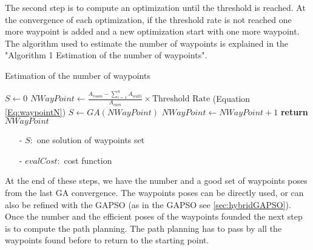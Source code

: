 The second step is to compute an optimization until the threshold is reached. At the convergence of each optimization, if the threshold rate is not reached one more waypoint is added and a new optimization start with one more waypoint. The algorithm used to estimate the number of waypoints is explained in the "Algorithm 1 Estimation of the number of waypoints".  \\
\begin{algorithm}{}
\caption{Estimation of the number of waypoints}\label{alg:euclid}
\begin{algorithmic}[6]
 \State $S\gets 0$
  \State $NWayPoint\gets \frac{ A_{room} - \sum_{i=1}^n A_{wall i} }{A_{cam}} \times \mbox{Threshold Rate} 
 $  (Equation \ref{Eq:waypointN})
	 \State $S \gets GA(NWayPoint)$
	  \State $NWayPoint\gets NWayPoint+1$
  \EndWhile\label{endwhile}
\State \textbf{return} $NWayPoint$
\EndProcedure
\end{algorithmic}
\end{algorithm}
\begin{itemize}
\item[-] $S:$ one solution of waypoints set 
\item[-] $evalCost:$ cost function  
\end{itemize}
At the end of these steps, we have the number and a good set of waypoints poses from the last GA convergence. The waypoints poses can be directly used, or can also be refined with the GAPSO (as in the GAPSO see \ref{sec:hybridGAPSO}). Once the number and the efficient poses of the waypoints founded the next step is to compute the path planning. The path planning has to pass by all the waypoints found before to return to the starting point.  
	
 
